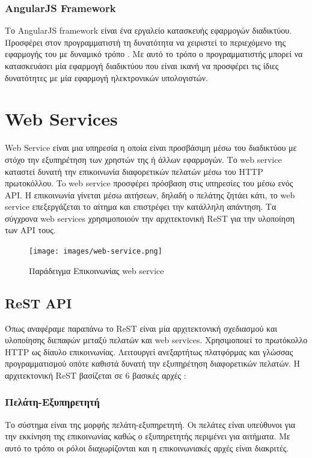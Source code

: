 \subsubsection{AngularJS Framework}
Το AngularJS framework είναι ένα εργαλείο κατασκευής εφαρμογών διαδικτύου. Προσφέρει στον προγραμματιστή τη δυνατότητα να χειριστεί το περιεχόμενο της εφαρμογής του με δυναμικό τρόπο \citep{AngularJS} \citep{AngularJSWiki}. Με αυτό το τρόπο ο προγραμματιστής μπορεί να κατασκευάσει μία εφαρμογή διαδικτύου που είναι ικανή να προσφέρει τις ίδιες δυνατότητες με μία εφαρμογή ηλεκτρονικών υπολογιστών.

\section{Web Services}
Web Service είναι μια υπηρεσία η οποία είναι προσβάσιμη μέσω του διαδικτύου με στόχο την εξυπηρέτηση των χρηστών της ή άλλων εφαρμογών. Το web service καταστεί δυνατή την επικοινωνία διαφορετικών πελατών μέσω του HTTP πρωτοκόλλου. To web service προσφέρει πρόσβαση στις υπηρεσίες του μέσω ενός API. Η επικοινωνία γίνεται μέσω αιτήσεων, δηλαδή ο πελάτης ζητάει κάτι, το web service επεξεργάζεται το αίτημα και επιστρέφει την κατάλληλη απάντηση. Τα σύγχρονα web services χρησιμοποιούν την αρχιτεκτονική ReST για την υλοποίηση των API τους.

\begin{figure}[h]
  \centering
  \texttt{[image: images/web-service.png]}
  \caption{Παράδειγμα Επικοινωνίας web service}
  \label{fig:web-service}
\end{figure}

\subsection{ReST API}
Όπως αναφέραμε παραπάνω το ReST είναι μία αρχιτεκτονική σχεδιασμού και υλοποίησης διεπαφών μεταξύ πελατών και web services. Χρησιμοποιεί το πρωτόκολλο HTTP ως δίαυλο επικοινωνίας. Λειτουργεί ανεξαρτήτως πλατφόρμας και γλώσσας προγραμματισμού οπότε καθιστά δυνατή την εξυπηρέτηση διαφορετικών πελατών. Η αρχιτεκτονική ReST βασίζεται σε 6 βασικές αρχές \citep{ReST}:

\subsubsection{Πελάτη-Εξυπηρετητή}
Το σύστημα είναι της μορφής πελάτη-εξυπηρετητή. Οι πελάτες είναι υπεύθυνοι για την εκκίνηση της επικοινωνίας καθώς ο εξυπηρετητής περιμένει για αιτήματα. Με αυτό το τρόπο οι ρόλοι διαχωρίζονται και η επικοινωνιακές αρχές είναι διακριτές.

